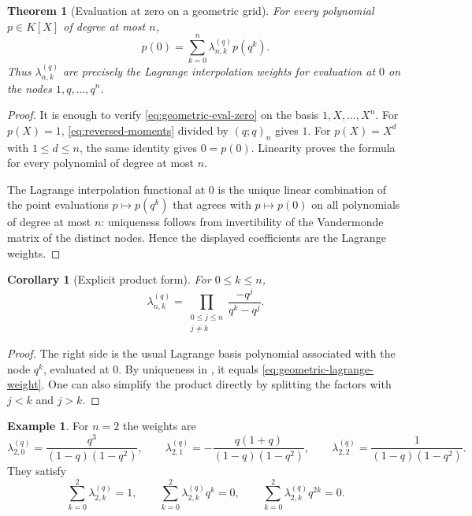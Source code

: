 \documentclass[11pt,a4paper,oneside,openany]{book}
\newtheorem{theorem}{Theorem}[chapter]
\newtheorem{corollary}[corollary]{Corollary}
\theoremstyle{definition}
\newtheorem{example}[example]{Example}
\theoremstyle{remark}
\begin{document}
\begin{theorem}[Evaluation at zero on a geometric grid]\label{thm:geometric-evaluation-zero}
For every polynomial $p\in K[X]$ of degree at most $n$,
\begin{equation}\label{eq:geometric-eval-zero}
 p(0)=\sum_{k=0}^{n}\lambda_{n,k}^{(q)}p(q^k).
\end{equation}
Thus $\lambda_{n,k}^{(q)}$ are precisely the Lagrange interpolation weights for evaluation at $0$ on the nodes $1,q,\ldots,q^n$.
\end{theorem}

\begin{proof}
It is enough to verify \eqref{eq:geometric-eval-zero} on the basis
$1,X,\ldots,X^n$.  For $p(X)=1$, \eqref{eq:reversed-moments} divided by
$(q;q)_n$ gives $1$.  For $p(X)=X^d$ with $1\le d\le n$, the same identity gives $0=p(0)$.  Linearity proves the formula for every polynomial of degree at most $n$.

The Lagrange interpolation functional at $0$ is the unique linear combination of the point evaluations $p\mapsto p(q^k)$ that agrees with $p\mapsto p(0)$ on all polynomials of degree at most $n$: uniqueness follows from invertibility of the Vandermonde matrix of the distinct nodes.  Hence the displayed coefficients are the Lagrange weights.
\end{proof}

\begin{corollary}[Explicit product form]\label{cor:geometric-lagrange-product}
For $0\le k\le n$,
\begin{equation}\label{eq:geometric-lagrange-product}
 \lambda_{n,k}^{(q)}
 =\prod_{\substack{0\le j\le n\\j\ne k}}
   \frac{-q^j}{q^k-q^j}.
\end{equation}
\end{corollary}

\begin{proof}
The right side is the usual Lagrange basis polynomial associated with the node $q^k$, evaluated at $0$.  By uniqueness in , it equals \eqref{eq:geometric-lagrange-weight}.  One can also simplify the product directly by splitting the factors with $j<k$ and $j>k$.
\end{proof}

\begin{example}
For $n=2$ the weights are
\[
 \lambda_{2,0}^{(q)}=\frac{q^3}{(1-q)(1-q^2)},\qquad
 \lambda_{2,1}^{(q)}=-\frac{q(1+q)}{(1-q)(1-q^2)},\qquad
 \lambda_{2,2}^{(q)}=\frac1{(1-q)(1-q^2)}.
\]
They satisfy
\[
 \sum_{k=0}^{2}\lambda_{2,k}^{(q)}=1,
 \qquad
 \sum_{k=0}^{2}\lambda_{2,k}^{(q)}q^k=0,
 \qquad
 \sum_{k=0}^{2}\lambda_{2,k}^{(q)}q^{2k}=0.
\]
\end{example}
\end{document}
